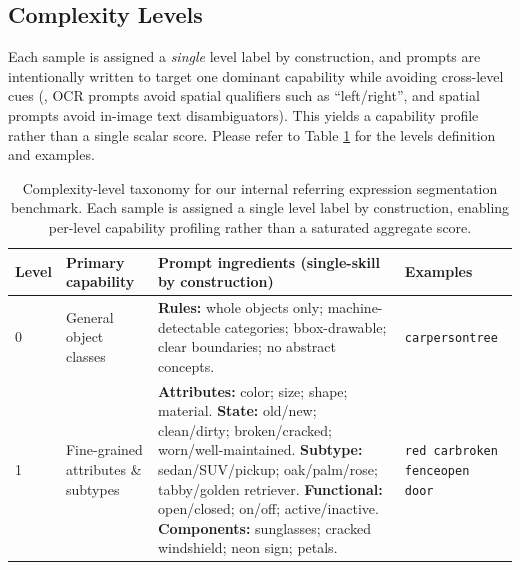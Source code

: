 \subsection{Complexity Levels}
\label{sec:complexity-levels}

Each sample is assigned a \emph{single} level label by construction, and prompts are intentionally written to target one dominant capability while avoiding cross-level cues (\eg, OCR prompts avoid spatial qualifiers such as ``left/right'', and spatial prompts avoid in-image text disambiguators). This yields a capability profile rather than a single scalar score. Please refer to Table \ref{tab:complexity_levels} for the levels definition and examples.


\begin{table}[t]
\centering
\footnotesize
\caption{Complexity-level taxonomy for our internal referring expression segmentation benchmark. Each sample is assigned a single level label by construction, enabling per-level capability profiling rather than a saturated aggregate score.\vspace{-0.3cm}}
\label{tab:complexity_levels}
\setlength{\tabcolsep}{5pt}
\renewcommand{\arraystretch}{1.2}
\begin{tabularx}{\textwidth}{p{} p{} >{\raggedright\arraybackslash}X p{}}
\toprule
\textbf{Level} & \textbf{Primary capability} & \textbf{Prompt ingredients \newline(single-skill by construction)} & \textbf{Examples} \\
\midrule
0 & General object classes &
\textbf{Rules:} whole objects only; machine-detectable categories; bbox-drawable; clear boundaries; no abstract concepts. &
\texttt{car}\newline\texttt{person}\newline\texttt{tree} \\
\midrule
1 & Fine-grained \newline attributes \& subtypes &
\textbf{Attributes:} color; size; shape; material.\newline
\textbf{State:} old/new; clean/dirty; broken/cracked; worn/well-maintained.\newline
\textbf{Subtype:} sedan/SUV/pickup; oak/palm/rose; tabby/golden retriever.\newline
\textbf{Functional:} open/closed; on/off; active/inactive.\newline
\textbf{Components:} sunglasses; cracked windshield; neon sign; petals. &
\texttt{red car}\newline\newline\texttt{broken fence}\newline\newline\texttt{open door} \\

\end{tabularx}
\end{table}
